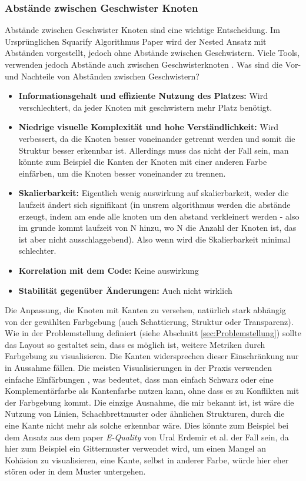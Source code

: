 \subsubsection{Abstände zwischen Geschwister Knoten} \label{sec:AbständeGeschwister}
Abstände zwischen Geschwister Knoten sind eine wichtige Entscheidung. Im Ursprünglichen Squarify Algorithmus Paper \cite{bruls2000squarified} wird der Nested Ansatz mit Abständen vorgestellt, jedoch ohne Abstände zwischen Geschwistern. Viele Tools, verwenden jedoch Abstände auch zwischen Geschwisterknoten \cite{codeCity1, code_charta_webdemo, sereene_website}.
Was sind die Vor- und Nachteile von Abständen zwischen Geschwistern?
\begin{itemize}
    \item \textbf{Informationsgehalt und effiziente Nutzung des Platzes:} Wird verschlechtert, da jeder Knoten mit geschwistern mehr Platz benötigt. 
    \item \textbf{Niedrige visuelle Komplexität und hohe Verständlichkeit:} Wird verbessert, da die Knoten besser voneinander getrennt werden und somit die Struktur besser erkennbar ist. Allerdings muss das nicht der Fall sein, man könnte zum Beispiel die Kanten der Knoten mit einer anderen Farbe einfärben, um die Knoten besser voneinander zu trennen.
    \item \textbf{Skalierbarkeit:} Eigentlich wenig auswirkung auf skalierbarkeit, weder die laufzeit ändert sich signifikant (in unsrem algorithmus werden die abstände erzeugt, indem am ende alle knoten um den abstand verkleinert werden - also im grunde kommt laufzeit von N hinzu, wo N die Anzahl der Knoten ist, das ist aber nicht ausschlaggebend). Also wenn wird die Skalierbarkeit minimal schlechter.
    \item \textbf{Korrelation mit dem Code:} Keine auswirkung
    \item \textbf{Stabilität gegenüber Änderungen:} Auch nicht wirklich
\end{itemize}

Die Anpassung, die Knoten mit Kanten zu versehen, natürlich stark abhängig von der gewählten Farbgebung (auch Schattierung, Struktur oder Transparenz). Wie in der Problemstellung definiert (siehe Abschnitt \ref{sec:Problemstellung}) sollte das Layout so gestaltet sein, dass es möglich ist, weitere Metriken durch Farbgebung zu visualisieren. Die Kanten widersprechen dieser Einschränkung nur in Aussahme fällen. Die meisten Visualisierungen in der Praxis verwenden einfache Einfärbungen \cite{codeCity1, code_charta_webdemo, sereene_website}, was bedeutet, dass man einfach Schwarz oder eine Komplementärfarbe als Kantenfarbe nutzen kann, ohne dass es zu Konflikten mit der Farbgebung kommt. Die einzige Ausnahme, die mir bekannt ist, ist wäre die Nutzung von Linien, Schachbrettmuster oder ähnlichen Strukturen, durch die eine Kante nicht mehr als solche erkennbar wäre. Dies könnte zum Beispiel bei dem Ansatz aus dem paper \textit{E-Quality} von Ural Erdemir et al. \cite{equality_ugly} der Fall sein, da hier zum Beispiel ein Gittermuster verwendet wird, um einen Mangel an Kohäsion zu visualisieren, eine Kante, selbst in anderer Farbe, würde hier eher stören oder in dem Muster untergehen. 


